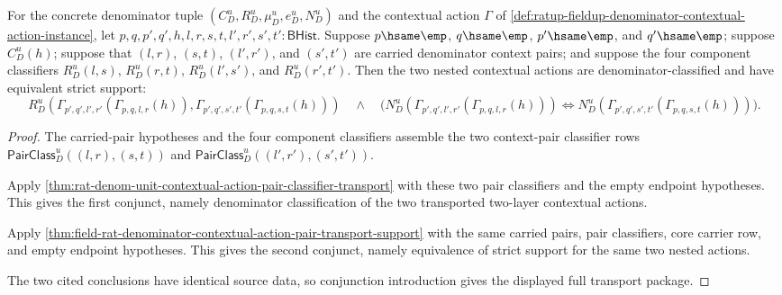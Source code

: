 \begin{theorem}
\label{thm:ratup-fieldup-contextual-action-pair-full-transport-package}
For the concrete denominator tuple
$(C_D^u,R_D^u,\mu_D^u,e_D^u,N_D^u)$ and the contextual action $\Gamma$ of
\autoref{def:ratup-fieldup-denominator-contextual-action-instance}, let
$p,q,p',q',h,l,r,s,t,l',r',s',t':\mathsf{BHist}$. Suppose
$p\hsame\emp$, $q\hsame\emp$, $p'\hsame\emp$, and $q'\hsame\emp$; suppose
$C_D^u(h)$; suppose that $(l,r)$, $(s,t)$, $(l',r')$, and $(s',t')$ are carried
denominator context pairs; and suppose the four component classifiers
$R_D^u(l,s)$, $R_D^u(r,t)$, $R_D^u(l',s')$, and $R_D^u(r',t')$. Then the two
nested contextual actions are denominator-classified and have equivalent strict
support:
$$
R_D^u(\Gamma_{p',q',l',r'}(\Gamma_{p,q,l,r}(h)),
\Gamma_{p',q',s',t'}(\Gamma_{p,q,s,t}(h)))
\quad\land\quad
\bigl(N_D^u(\Gamma_{p',q',l',r'}(\Gamma_{p,q,l,r}(h)))
\Longleftrightarrow
N_D^u(\Gamma_{p',q',s',t'}(\Gamma_{p,q,s,t}(h)))\bigr).
$$
\end{theorem}
\begin{proof}
The carried-pair hypotheses and the four component classifiers assemble the two
context-pair classifier rows
$\mathsf{PairClass}_D^u((l,r),(s,t))$ and
$\mathsf{PairClass}_D^u((l',r'),(s',t'))$.

Apply
\autoref{thm:rat-denom-unit-contextual-action-pair-classifier-transport} with
these two pair classifiers and the empty endpoint hypotheses. This gives the
first conjunct, namely denominator classification of the two transported
two-layer contextual actions.

Apply
\autoref{thm:field-rat-denominator-contextual-action-pair-transport-support}
with the same carried pairs, pair classifiers, core carrier row, and empty
endpoint hypotheses. This gives the second conjunct, namely equivalence of
strict support for the same two nested actions.

The two cited conclusions have identical source data, so conjunction
introduction gives the displayed full transport package.
\end{proof}

